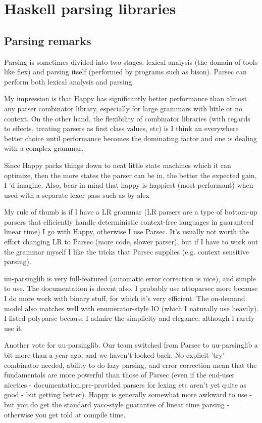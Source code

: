 
\section{Haskell parsing libraries}
\label{sec:libraries}

\subsection{Parsing remarks}
Parsing is sometimes divided into two stages: lexical analysis (the domain of tools like flex) and parsing itself (performed by programs such as bison). Parsec can perform both lexical analysis and parsing.

My impression is that Happy has significantly better performance than almost any parser combinator library, especially for large grammars with little or no context. On the other hand, the flexibility of combinator libraries (with regards to effects, treating parsers as first class values, etc) is I think an everywhere better choice until performance becomes the dominating factor and one is dealing with a complex grammar.

Since Happy packs things down to neat little state machines which it can optimize, then the more states the parser can be in, the better the expected gain, I 'd imagine. Also, bear in mind that happy is happiest (most performant) when used with a separate lexer pass such as by alex

My rule of thumb is if I have a LR grammar (LR parsers are a type of bottom-up parsers that efficiently handle deterministic context-free languages in guaranteed linear time) I go with Happy, otherwise I use Parsec. It's usually not worth the effort changing LR to Parsec (more code, slower parser), but if I have to work out the grammar myself I like the tricks that Parsec supplies (e.g. context sensitive parsing).

uu-parsinglib is very full-featured (automatic error correction is nice), and simple to use. The documentation is decent also. I probably use attoparsec more because I do more work with binary stuff, for which it's very efficient. The on-demand model also matches well with enumerator-style IO (which I naturally use heavily). I listed polyparse because I admire the simplicity and elegance, although I rarely use it.

Another vote for uu-parsinglib. Our team switched from Parsec to uu-parsinglib a bit more than a year ago, and we haven't looked back. No explicit 'try' combinator needed, ability to do lazy parsing, and error correction mean that the fundamentals are more powerful than those of Parsec (even if the end-user niceties - documentation,pre-provided parsers for lexing etc aren't yet quite as good - but getting better). Happy is generally somewhat more awkward to use - but you do get the standard yacc-style guarantee of linear time parsing - otherwise you get told at compile time. 


